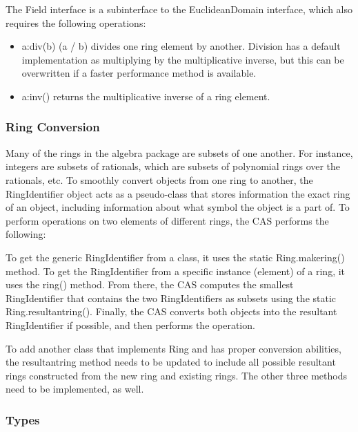 \documentclass{article}
\begin{document}
The {\ttfamily Field} interface is a subinterface to the {\ttfamily EuclideanDomain} interface, which also requires the following operations:

\begin{itemize}
    \item {\ttfamily a:div(b) (a / b)} divides one ring element by another. Division has a default implementation as multiplying by the multiplicative inverse, but this can be overwritten if a faster performance method is available.
     \item {\ttfamily a:inv()} returns the multiplicative inverse of a ring element.
\end{itemize}


\subsubsection{Ring Conversion}

Many of the rings in the algebra package are subsets of one another. For instance, integers are subsets of rationals, which are subsets of polynomial rings over the rationals, etc. To smoothly convert objects from one ring to another, the {\ttfamily RingIdentifier} object acts as a pseudo-class that stores information the exact ring of an object, including information about what symbol the object is a part of. To perform operations on two elements of different rings, the CAS performs the following: 

To get the generic {\ttfamily RingIdentifier} from a class, it uses the static {\ttfamily Ring.makering()} method. To get the {\ttfamily RingIdentifier} from a specific instance (element) of a ring, it uses the {\ttfamily ring()} method. From there, the CAS computes the smallest {\ttfamily RingIdentifier} that contains the two {\ttfamily RingIdentifier}s as subsets using the static {\ttfamily Ring.resultantring()}. Finally, the CAS converts both objects into the resultant {\ttfamily RingIdentifier} if possible, and then performs the operation.

To add another class that implements {\ttfamily Ring} and has proper conversion abilities, the {\ttfamily resultantring} method needs to be updated to include all possible resultant rings constructed from the new ring and existing rings. The other three methods need to be implemented, as well.

\subsubsection{Types}
\end{document}
